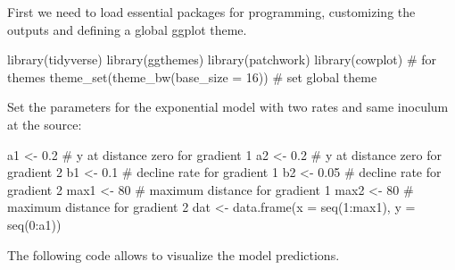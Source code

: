 \documentclass[
  letterpaper,
  DIV=11,
  numbers=noendperiod]{scrreprt}
\newenvironment{Shaded}{\begin{snugshade}}{\end{snugshade}}
\newcommand{\AttributeTok}[1]{\textcolor[rgb]{0.40,0.45,0.13}{#1}}
\newcommand{\CommentTok}[1]{\textcolor[rgb]{0.37,0.37,0.37}{#1}}
\newcommand{\DecValTok}[1]{\textcolor[rgb]{0.68,0.00,0.00}{#1}}
\newcommand{\FloatTok}[1]{\textcolor[rgb]{0.68,0.00,0.00}{#1}}
\newcommand{\FunctionTok}[1]{\textcolor[rgb]{0.28,0.35,0.67}{#1}}
\newcommand{\NormalTok}[1]{\textcolor[rgb]{0.00,0.23,0.31}{#1}}
\newcommand{\OtherTok}[1]{\textcolor[rgb]{0.00,0.23,0.31}{#1}}
\newcommand{\SpecialCharTok}[1]{\textcolor[rgb]{0.37,0.37,0.37}{#1}}
\begin{document}
First we need to load essential packages for programming, customizing
the outputs and defining a global ggplot theme.

\begin{Shaded}
\begin{Highlighting}[]
\FunctionTok{library}\NormalTok{(tidyverse)}
\FunctionTok{library}\NormalTok{(ggthemes)}
\FunctionTok{library}\NormalTok{(patchwork)}
\FunctionTok{library}\NormalTok{(cowplot) }\CommentTok{\# for themes }
\FunctionTok{theme\_set}\NormalTok{(}\FunctionTok{theme\_bw}\NormalTok{(}\AttributeTok{base\_size =} \DecValTok{16}\NormalTok{)) }\CommentTok{\# set global theme}
\end{Highlighting}
\end{Shaded}

Set the parameters for the exponential model with two rates and same
inoculum at the source:

\begin{Shaded}
\begin{Highlighting}[]
\NormalTok{a1 }\OtherTok{\textless{}{-}} \FloatTok{0.2} \CommentTok{\# y at distance zero for gradient 1}
\NormalTok{a2 }\OtherTok{\textless{}{-}} \FloatTok{0.2} \CommentTok{\# y at distance zero for gradient 2}
\NormalTok{b1 }\OtherTok{\textless{}{-}} \FloatTok{0.1} \CommentTok{\# decline rate for gradient 1}
\NormalTok{b2 }\OtherTok{\textless{}{-}} \FloatTok{0.05} \CommentTok{\# decline rate for gradient 2}
\NormalTok{max1 }\OtherTok{\textless{}{-}} \DecValTok{80} \CommentTok{\# maximum distance for gradient 1}
\NormalTok{max2 }\OtherTok{\textless{}{-}} \DecValTok{80} \CommentTok{\# maximum distance for gradient 2}
\NormalTok{dat }\OtherTok{\textless{}{-}} \FunctionTok{data.frame}\NormalTok{(}\AttributeTok{x =} \FunctionTok{seq}\NormalTok{(}\DecValTok{1}\SpecialCharTok{:}\NormalTok{max1), }\AttributeTok{y =} \FunctionTok{seq}\NormalTok{(}\DecValTok{0}\SpecialCharTok{:}\NormalTok{a1))}
\end{Highlighting}
\end{Shaded}

The following code allows to visualize the model predictions.
\end{document}
